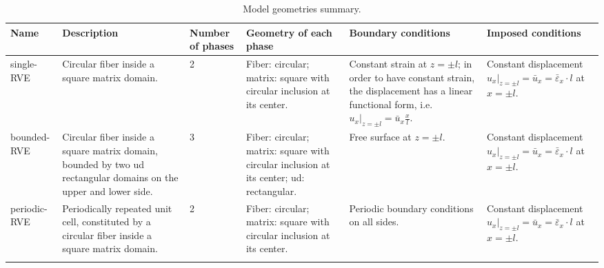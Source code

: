 \begin{sidewaystable}[htbp]
  \centering
  \small
  \caption{Model geometries summary.}
    \begin{tabularx}{\textwidth}{lXp{}XXX}
    \toprule
  \textbf{Name} & \textbf{Description}&\textbf{Number of phases}&\textbf{Geometry of each phase}&\textbf{Boundary conditions}&\textbf{Imposed conditions} \\
    \midrule
   single-RVE &Circular fiber inside a square matrix domain.&2&Fiber: circular; matrix: square with circular inclusion at its center.&Constant strain at $z=\pm l$; in order to have constant strain, the displacement has a linear functional form, i.e. $u_{x}|_{z=\pm l}=\bar{u}_{x}\frac{x}{l}$.&Constant displacement $u_{x}|_{z=\pm l}=\bar{u}_{x}=\bar{\varepsilon}_{x}\cdot l$ at $x=\pm l$.\\
 \midrule
   bounded-RVE&Circular fiber inside a square matrix domain, bounded by two \acrshort{ud} rectangular domains on the upper and lower side.&3&Fiber: circular; matrix: square with circular inclusion at its center; \acrshort{ud}: rectangular.&Free surface at $z=\pm l$.&Constant displacement $u_{x}|_{z=\pm l}=\bar{u}_{x}=\bar{\varepsilon}_{x}\cdot l$ at $x=\pm l$.\\
 \midrule
   periodic-RVE&Periodically repeated unit cell, constituted by a circular fiber inside a square matrix domain.&2&Fiber: circular; matrix: square with circular inclusion at its center.&Periodic boundary conditions on all sides.&Constant displacement $u_{x}|_{z=\pm l}=\bar{u}_{x}=\bar{\varepsilon}_{x}\cdot l$ at $x=\pm l$.\\
    &&&&&\\
    \bottomrule
    \end{tabularx}%
  \label{tab:geom_tab}%
\end{sidewaystable}%

